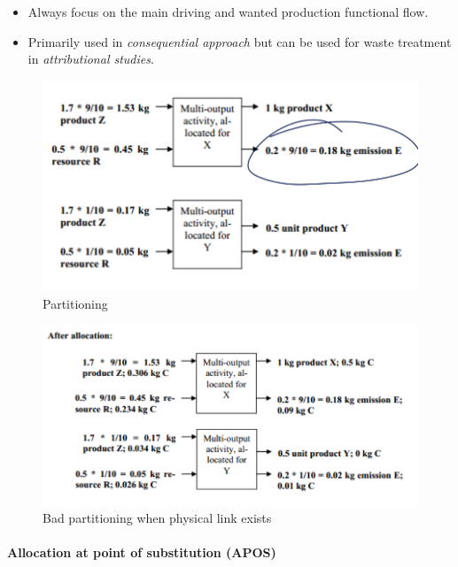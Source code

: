 \begin{enumerate}
  \begin{itemize}
  \tightlist
  \item
    Always focus on the main driving and wanted production functional
    flow.
  \item
    Primarily used in \emph{consequential approach} but can be used for
    waste treatment in \emph{attributional studies}.
  \end{itemize}
\end{enumerate}

\begin{figure}
\centering
\includegraphics{image-3.png}
\caption{Partitioning}
\end{figure}

\begin{figure}
\centering
\includegraphics{image-4.png}
\caption{Bad partitioning when physical link exists}
\end{figure}

\hypertarget{allocation-at-point-of-substitution-apos}{%
\paragraph{Allocation at point of substitution
(APOS)}\label{allocation-at-point-of-substitution-apos}}

